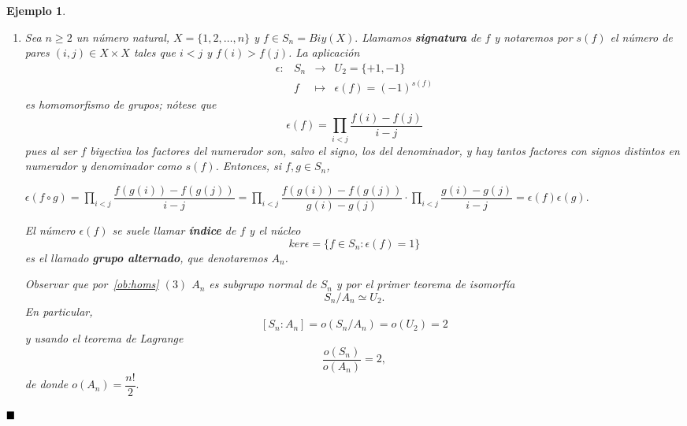 \documentclass[12pt]{article}
\newtheorem{example}{Ejemplo}[theorem]
\begin{document}
\begin{example}
\begin{enumerate}
\item Sea $n\geq 2$ un número natural, $X = \lbrace 1,2, \ldots, n \rbrace$ y $f \in S_n = Biy(X).$ Llamamos \textbf{signatura} de $f$ y notaremos por $s(f)$ el número de pares $(i,j) \in X \times X$ tales que $i <j$ y $f(i) > f(j)$. La aplicación $$\begin{array}{rccl}
\epsilon\colon &S_n& \longrightarrow &U_2=\lbrace +1, -1 \rbrace\\
&f& \longmapsto &\epsilon(f) = (-1)^{s(f)}
\end{array}$$ es homomorfismo de grupos; nótese que $$\epsilon(f) =\prod_{i<j} \dfrac{f(i)-f(j)}{i-j}$$ pues al ser $f$ biyectiva los factores del numerador son, salvo el signo, los del denominador, y hay tantos factores con signos distintos en numerador y denominador como $s(f)$. Entonces, si $f,g \in S_n$, \begin{center}$\epsilon(f \circ g) = \prod_{i<j} \dfrac{f(g(i))-f(g(j))}{i-j} = \prod_{i<j} \dfrac{f(g(i))-f(g(j))}{g(i)-g(j)} \cdot \prod_{i<j} \dfrac{g(i)-g(j)}{i-j} = \epsilon(f) \epsilon(g).$\end{center}
El número $\epsilon(f)$ se suele llamar \textbf{índice} de $f$ y el núcleo $$ker \epsilon = \lbrace f \in S_n: \epsilon(f) = 1 \rbrace$$ es el llamado \textbf{grupo alternado}, que denotaremos $A_n$.

Observar que por~\ref{ob:homs} $(3)$ $A_n$ es subgrupo normal de $S_n$ y por el primer teorema de isomorfía $$S_n/A_n \simeq U_2.$$ En particular, $$[S_n:A_n] = o(S_n/A_n)= o(U_2)=2$$ y usando el teorema de Lagrange $$\dfrac{o(S_n)}{o(A_n)}=2,$$ de donde $o(A_n) = \dfrac{n!}{2}.$
\end{enumerate}
\end{example}

$\hfill \blacksquare$
\end{document}
